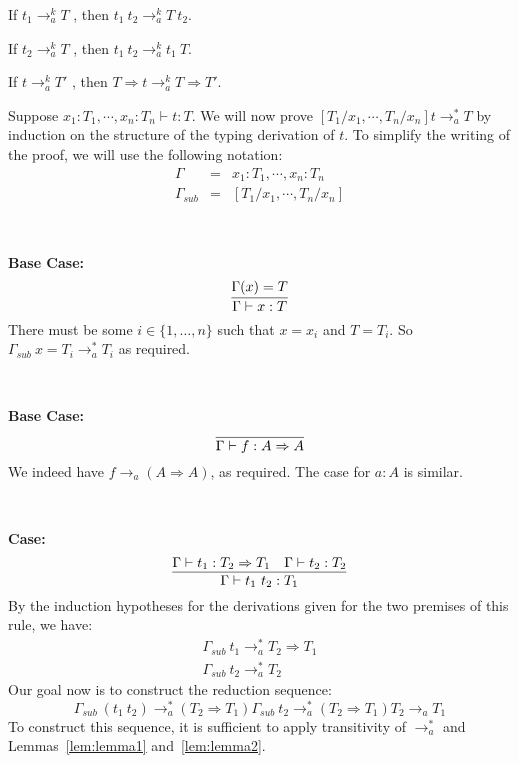 \documentclass{LMCS}
\newcommand{\To}[0]{\Rightarrow}
\begin{document}
\begin{lem}
\label{lem:lemma1}
If $t_1 \to_a^k T$ , then
$t_1\ t_2 \to_a^k T\ t_2$.
\end{lem}
\begin{lem}
\label{lem:lemma2}
If $t_2 \to_a^k T$ , then
$t_1\ t_2 \to_a^k t_1\ T$.
\end{lem}
\begin{lem}
\label{lem:lemma3}
If $t \to_a^k T'$ , then $T \To t \to_a^k T \To T'$.
\end{lem}

Suppose $x_1:T_1,\cdots,x_n:T_n \vdash t:T$.
We will now prove $[T_1/x_1,\cdots,T_n/x_n]t \to_a^* T$ by
induction on the structure of the typing derivation of $t$.
To simplify the writing of the proof, we will use the
following notation:
\[
\begin{array}{lll}
\Gamma & = & x_1:T_1,\cdots,x_n:T_n \\
\Gamma_{sub} & = & [T_1/x_1,\cdots,T_n/x_n]
\end{array}
\]

\

\noindent \textbf{Base Case:}
\[
\infer{\Gamma\vdash x : T}{\Gamma(x) = T}
\]
\noindent There must be some $i\in\{1,\ldots,n\}$ such that $x = x_i$ and $T = T_i$.
So $\Gamma_{sub}\ x = T_i \to_a^* T_i$ as required.

\

\noindent\textbf{Base Case:}
\[
\infer{\Gamma\vdash f : A\To A}{\ }
\]
\noindent We indeed have $f\to_a (A\To A)$, as required.  The case for
$a:A$ is similar.

\

\noindent \textbf{Case:}
\[
\infer{\Gamma\vdash t_1\ t_2 : T_1}
      {\Gamma\vdash t_1 : T_2 \To T_1 &
       \Gamma\vdash t_2 : T_2}
\]
\noindent By the induction hypotheses for the derivations given for
the two premises of this rule, we have:
\[
\begin{array}{l}
\Gamma_{sub}\ t_1 \to_a^* T_2 \To T_1 \\
\Gamma_{sub}\ t_2 \to_a^* T_2
\end{array}
\]
\noindent Our goal now is to construct the reduction sequence:
\[
\Gamma_{sub}\ (t_1\ t_2) \to_a^* (T_2 \To T_1)\Gamma_{sub}\ t_2 \to_a^*
(T_2 \To T_1)T_2 \to_a T_1
\]
\noindent To construct this sequence, it is sufficient to apply transitivity of
$\to_a^*$ and Lemmas~\ref{lem:lemma1} and~\ref{lem:lemma2}.

\ 
\end{document}
